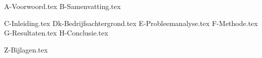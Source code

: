 \documentclass[10pt,a4paper,twoside]{report}
\begin{document}

{A-Voorwoord.tex}
{B-Samenvatting.tex}

\setcounter{page}{5} %
\tableofcontents
\thispagestyle{empty} %

{C-Inleiding.tex}
{Dk-Bedrijfsachtergrond.tex}
{E-Probleemanalyse.tex}
{F-Methode.tex}
{G-Resultaten.tex}
{H-Conclusie.tex}

\printglossary[title=Begrippenlijst]
\printbibliography
{} %

{Z-Bijlagen.tex}
\end{document}
